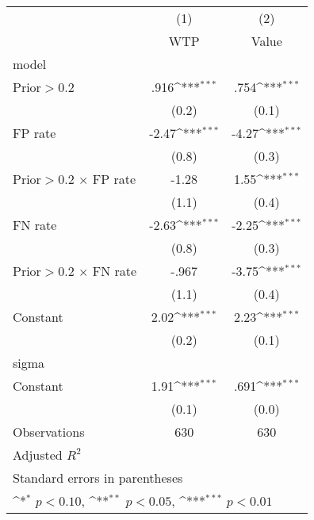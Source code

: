 {
\def\sym#1{\ifmmode^{#1}\else\(^{#1}\)\fi}
\begin{tabular}{l*{2}{c}}
\hline\hline
                &\multicolumn{1}{c}{(1)}&\multicolumn{1}{c}{(2)}\\
                &\multicolumn{1}{c}{WTP}&\multicolumn{1}{c}{Value}\\
\hline
model           &                  &                  \\
Prior$>$0.2     &     .916\sym{***}&     .754\sym{***}\\
                &    (0.2)         &    (0.1)         \\
FP rate         &    -2.47\sym{***}&    -4.27\sym{***}\\
                &    (0.8)         &    (0.3)         \\
Prior$>$0.2 $\times$ FP rate&    -1.28         &     1.55\sym{***}\\
                &    (1.1)         &    (0.4)         \\
FN rate         &    -2.63\sym{***}&    -2.25\sym{***}\\
                &    (0.8)         &    (0.3)         \\
Prior$>$0.2 $\times$ FN rate&    -.967         &    -3.75\sym{***}\\
                &    (1.1)         &    (0.4)         \\
Constant        &     2.02\sym{***}&     2.23\sym{***}\\
                &    (0.2)         &    (0.1)         \\
\hline
sigma           &                  &                  \\
Constant        &     1.91\sym{***}&     .691\sym{***}\\
                &    (0.1)         &    (0.0)         \\
\hline
Observations    &      630         &      630         \\
Adjusted \(R^{2}\)&                  &                  \\
\hline\hline
\multicolumn{3}{l}{\footnotesize Standard errors in parentheses}\\
\multicolumn{3}{l}{\footnotesize \sym{*} \(p<0.10\), \sym{**} \(p<0.05\), \sym{***} \(p<0.01\)}\\
\end{tabular}
}
